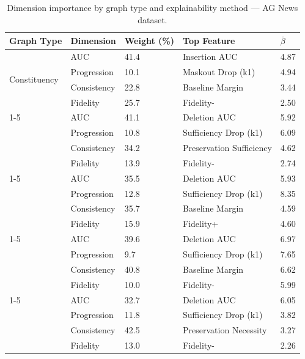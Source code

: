 \documentclass[review,12pt]{elsarticle}
\begin{document}
\begin{table}[!ht]
\centering
\renewcommand{\arraystretch}{1.1}
\tiny
\setlength{\tabcolsep}{5pt}
\caption{Dimension importance by graph type and explainability method --- AG News dataset.}
\label{tab:dimension_agnews}
\begin{tabular}{@{}m{2.3cm} m{2.2cm} m{1.2cm} m{4cm} m{0.8cm}@{}}
\toprule
\textbf{Graph Type} & \textbf{Dimension} & \textbf{Weight (\%)} & \textbf{Top Feature} & \textbf{$\bar{\beta}$} \\
\midrule
\multirow{4}{*}{Constituency}
& AUC & 41.4 & Insertion AUC & 4.87 \\
& Progression & 10.1 & Maskout Drop (k1) & 4.94 \\
& Consistency & 22.8 & Baseline Margin & 3.44 \\
& Fidelity & 25.7 & Fidelity- & 2.50 \\
\cmidrule{1-5}
\multirow{4}{*}{Syntactic}
& AUC & 41.1 & Deletion AUC & 5.92 \\
& Progression & 10.8 & Sufficiency Drop (k1) & 6.09 \\
& Consistency & 34.2 & Preservation Sufficiency & 4.62 \\
& Fidelity & 13.9 & Fidelity- & 2.74 \\
\cmidrule{1-5}
\multirow{4}{*}{Skipgrams}
& AUC & 35.5 & Deletion AUC & 5.93 \\
& Progression & 12.8 & Sufficiency Drop (k1) & 8.35 \\
& Consistency & 35.7 & Baseline Margin & 4.59 \\
& Fidelity & 15.9 & Fidelity+ & 4.60 \\
\cmidrule{1-5}
\multirow{4}{*}{Window}
& AUC & 39.6 & Deletion AUC & 6.97 \\
& Progression & 9.7 & Sufficiency Drop (k1) & 7.65 \\
& Consistency & 40.8 & Baseline Margin & 6.62 \\
& Fidelity & 10.0 & Fidelity- & 5.99 \\
\cmidrule{1-5}
\multirow{4}{*}{Tokens}
& AUC & 32.7 & Deletion AUC & 6.05 \\
& Progression & 11.8 & Sufficiency Drop (k1) & 3.82 \\
& Consistency & 42.5 & Preservation Necessity & 3.27 \\
& Fidelity & 13.0 & Fidelity- & 2.26 \\
\bottomrule
\end{tabular}
\end{table}
\end{document}
